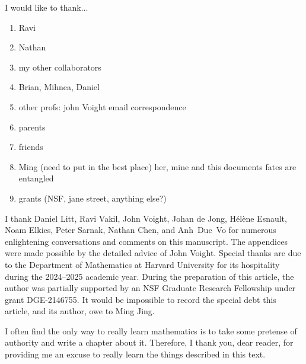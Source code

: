 
I would like to thank...

\begin{enumerate}
\item Ravi 
\item Nathan
\item my other collaborators
\item Brian, Mihnea, Daniel
\item other profs: john Voight email correspondence
\item parents
\item friends
\item Ming (need to put in the best place) her, mine and this documents fates are entangled 
\item grants (NSF, jane street, anything else?)
\end{enumerate}


I thank Daniel Litt, Ravi Vakil, John Voight, Johan de Jong, H\'{e}l\`{e}ne Esnault, Noam Elkies, Peter Sarnak, Nathan Chen, and Anh~Duc~Vo for numerous enlightening conversations and comments on this manuscript. The appendices were made possible by the detailed advice of John Voight. 
Special thanks are due to the Department of Mathematics at Harvard University for its hospitality during the 2024--2025 academic year. During the preparation of this article, the author was partially supported by an NSF Graduate Research Fellowship under grant DGE-2146755. It would be impossible to record the special debt this article, and its author, owe to Ming Jing.


I often find the only way to really learn mathematics is to take some pretense of authority and write a chapter about it. Therefore, I thank you, dear reader, for providing me an excuse to really learn the things described in this text. 


